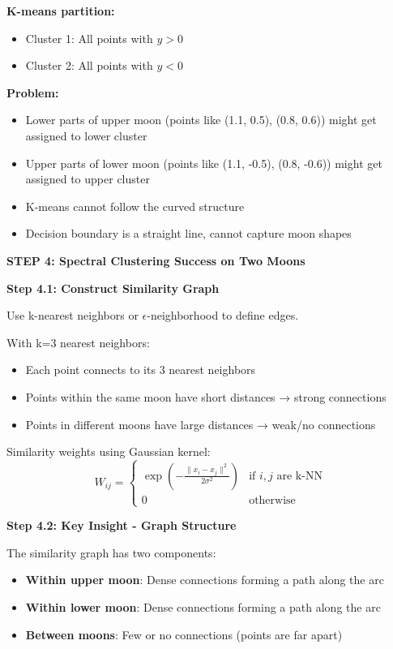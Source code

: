 \documentclass[12pt]{article}
\begin{document}
\begin{solution}
\textbf{K-means partition:}
\begin{itemize}
    \item Cluster 1: All points with $y > 0$
    \item Cluster 2: All points with $y < 0$
\end{itemize}

\textbf{Problem:}
\begin{itemize}
    \item Lower parts of upper moon (points like (1.1, 0.5), (0.8, 0.6)) might get assigned to lower cluster
    \item Upper parts of lower moon (points like (1.1, -0.5), (0.8, -0.6)) might get assigned to upper cluster
    \item K-means cannot follow the curved structure
    \item Decision boundary is a straight line, cannot capture moon shapes
\end{itemize}

\textbf{STEP 4: Spectral Clustering Success on Two Moons}

\textbf{Step 4.1: Construct Similarity Graph}

Use k-nearest neighbors or $\epsilon$-neighborhood to define edges.

With k=3 nearest neighbors:
\begin{itemize}
    \item Each point connects to its 3 nearest neighbors
    \item Points within the same moon have short distances → strong connections
    \item Points in different moons have large distances → weak/no connections
\end{itemize}

Similarity weights using Gaussian kernel:
\[
W_{ij} = \begin{cases}
\exp\left(-\frac{\|x_i - x_j\|^2}{2\sigma^2}\right) & \text{if } i, j \text{ are k-NN} \\
0 & \text{otherwise}
\end{cases}
\]

\textbf{Step 4.2: Key Insight - Graph Structure}

The similarity graph has two components:
\begin{itemize}
    \item \textbf{Within upper moon}: Dense connections forming a path along the arc
    \item \textbf{Within lower moon}: Dense connections forming a path along the arc
    \item \textbf{Between moons}: Few or no connections (points are far apart)
\end{itemize}


\end{solution}
\end{document}
